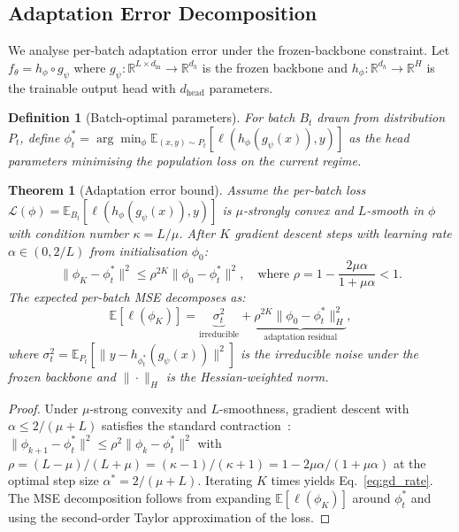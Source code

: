 \documentclass[11pt,a4paper]{article}
\newtheorem{theorem}{Theorem}
\newtheorem{definition}{Definition}
\begin{document}
\subsection{Adaptation Error Decomposition}
\label{sec:theory_adapt}

We analyse per-batch adaptation error under the frozen-backbone constraint. Let $f_\theta = h_\phi \circ g_\psi$ where $g_\psi: \mathbb{R}^{L \times d_{\text{in}}} \to \mathbb{R}^{d_h}$ is the frozen backbone and $h_\phi: \mathbb{R}^{d_h} \to \mathbb{R}^H$ is the trainable output head with $d_{\text{head}}$ parameters.

\begin{definition}[Batch-optimal parameters]
\label{def:batch_opt}
For batch $B_t$ drawn from distribution $P_t$, define $\phi^*_t = \arg\min_\phi \mathbb{E}_{(x,y) \sim P_t}[\ell(h_\phi(g_\psi(x)), y)]$ as the head parameters minimising the population loss on the current regime.
\end{definition}

\begin{theorem}[Adaptation error bound]
\label{thm:adaptation}
Assume the per-batch loss $\mathcal{L}(\phi) = \mathbb{E}_{B_t}[\ell(h_\phi(g_\psi(x)), y)]$ is $\mu$-strongly convex and $L$-smooth in $\phi$ with condition number $\kappa = L/\mu$. After $K$ gradient descent steps with learning rate $\alpha \in (0, 2/L)$ from initialisation $\phi_0$:
\begin{equation}
    \|\phi_K - \phi^*_t\|^2 \leq \rho^{2K} \|\phi_0 - \phi^*_t\|^2, \quad \text{where } \rho = 1 - \frac{2\mu\alpha}{1 + \mu\alpha} < 1.
    \label{eq:gd_rate}
\end{equation}
The expected per-batch MSE decomposes as:
\begin{equation}
    \mathbb{E}[\ell(\phi_K)] = \underbrace{\sigma^2_t}_{\text{irreducible}} + \underbrace{\rho^{2K} \|\phi_0 - \phi^*_t\|^2_H}_{\text{adaptation residual}},
    \label{eq:error_decomp}
\end{equation}
where $\sigma^2_t = \mathbb{E}_{P_t}[\|y - h_{\phi^*_t}(g_\psi(x))\|^2]$ is the irreducible noise under the frozen backbone and $\|\cdot\|_H$ is the Hessian-weighted norm.
\end{theorem}

\begin{proof}
Under $\mu$-strong convexity and $L$-smoothness, gradient descent with $\alpha \leq 2/(\mu + L)$ satisfies the standard contraction~\citep{nesterov2004introductory}:
$\|\phi_{k+1} - \phi^*_t\|^2 \leq \rho^2 \|\phi_k - \phi^*_t\|^2$ with $\rho = (L - \mu)/(L + \mu) = (\kappa - 1)/(\kappa + 1) = 1 - 2\mu\alpha/(1 + \mu\alpha)$ at the optimal step size $\alpha^* = 2/(\mu + L)$.
Iterating $K$ times yields Eq.~\ref{eq:gd_rate}. The MSE decomposition follows from expanding $\mathbb{E}[\ell(\phi_K)]$ around $\phi^*_t$ and using the second-order Taylor approximation of the loss.
\end{proof}
\end{document}
